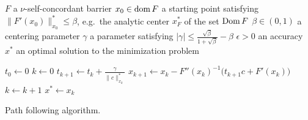 \begin{algorithm}[ht]
  \begin{algorithmic}[1]
    \Require
      \Statex $F$ a $\nu$-self-concordant barrier
      \Statex $x_0 \in \operatorname{dom} F$ a starting point satisfying $\|F'(x_0)\|^*_{x_0} \leq \beta$, e.g.\ the analytic center $x^*_F$ of the set $\operatorname{Dom} F$
      \Statex $\beta \in (0,1)$ a centering parameter
      \Statex $\gamma$ a parameter satisfying $|\gamma| \leq \frac{\sqrt{\beta}}{1+\sqrt{\beta}} - \beta$
      \Statex $\epsilon > 0$ an accuracy
    \Ensure
      \Statex $x^*$ an optimal solution to the minimization problem 
      \Statex

    \State $t_0 \gets 0$
    \State $k \gets 0$
      \State $t_{k+1} \gets t_k + \frac{\gamma}{\|c\|^*_{x_k}}$
      \State $x_{k+1} \gets x_k - F''(x_k)^{-1}\big(t_{k+1}c + F'(x_k)\big)$
      \State $k \gets k + 1$
    \EndWhile
    \State \Return $x^* \gets x_k$

  \end{algorithmic}
  \caption{Path following algorithm.}
\end{algorithm}

